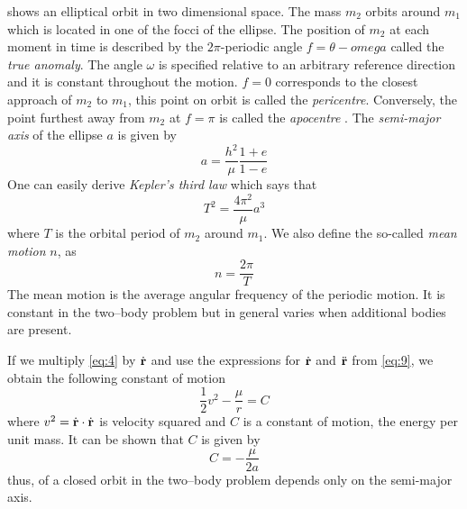  shows an elliptical orbit in two dimensional space. The mass
$m_2$ orbits around $m_1$ which is located in one of the focci of the ellipse.
The position of $m_2$ at each moment in time is described by the $2\pi$-periodic
angle 
$f=\theta - omega$ called the \emph{true anomaly}. The angle $\omega$ is specified 
relative to an arbitrary reference direction and it is constant throughout the 
motion. $f=0$ corresponds to the closest approach of $m_2$ to $m_1$, this point on
orbit is called the \emph{pericentre}. Conversely, the point furthest away from 
$m_2$ at $f=\pi$ is called the \emph{apocentre} . 
The \emph{semi-major axis} of the ellipse $a$ is given by
\begin{equation}
    a= \frac{h^2}{\mu} \frac{1+e}{1-e} 
\end{equation}
One can easily derive \citep[ex.][]{murray} \emph{Kepler's third law} which says 
that
\begin{equation}
    T^2= \frac{4\pi^2}{\mu} a^3
    \label{eq:kepler_law}
\end{equation}
where $T$ is the orbital period of $m_2$ around $m_1$. We also define the so-called
\emph{mean motion} $n$, as
\begin{equation}
    n= \frac{2\pi}{T} 
\end{equation}
The mean motion is the average angular frequency of the periodic motion. It is 
constant in the two--body problem but in general varies when additional bodies are 
present.

If we multiply \cref{eq:4} by $\dot{\boldsymbol{\mathbf{r}}}$ and use the expressions for
$\dot{\boldsymbol{\mathbf{r}}}$ and $\ddot{\boldsymbol{\mathbf{r}}}$ from \cref{eq:9}, we obtain the following
constant of motion
\begin{equation}
    \frac{1}{2} v^2 - \frac{\mu}{r} =C
\end{equation}
where $v^2=\dot{\boldsymbol{\mathbf{r}}}\cdot\dot{\boldsymbol{\mathbf{r}}}$ is velocity squared and $C$ is a
constant of motion, the energy per unit mass. It can be shown \citep{murray}
that $C$ is given by
\begin{equation}
    C= -\frac{\mu}{2a} 
\end{equation}
thus, of a closed orbit in the two--body problem depends only on the semi-major axis.
